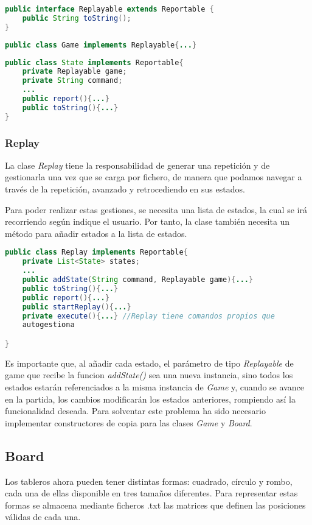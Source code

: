 \documentclass{article}
\begin{document}
\begin{lstlisting}[frame=single, language=Java]
public interface Replayable extends Reportable {
	public String toString();
}
\end{lstlisting}

\begin{lstlisting}[frame=single, language=Java]
public class Game implements Replayable{...}
\end{lstlisting}

\begin{lstlisting}[frame=single, language=Java]
public class State implements Reportable{
	private Replayable game;
	private String command;
	...
	public report(){...}
	public toString(){...}
}
\end{lstlisting}

\subsubsection*{Replay}
La clase \textit{Replay} tiene la responsabilidad de generar una repetición y de gestionarla una vez que se carga por fichero, de manera que podamos navegar a través de la repetición, avanzado y retrocediendo en sus estados.

Para poder realizar estas gestiones, se necesita una lista de estados, la cual se irá recorriendo según indique el usuario. Por tanto, la clase también necesita un método para añadir estados a la lista de estados.

\begin{lstlisting}[frame=single, language=Java]
public class Replay implements Reportable{
	private List<State> states;
	...
	public addState(String command, Replayable game){...}
	public toString(){...}
	public report(){...}
	public startReplay(){...}
	private execute(){...} //Replay tiene comandos propios que
	autogestiona

}
\end{lstlisting}

Es importante que, al añadir cada estado, el parámetro de tipo \textit{Replayable} de game que recibe la funcion \textit{addState()}  sea una nueva instancia, sino todos los estados estarán referenciados a la misma instancia de \textit{Game} y, cuando se avance en la partida, los cambios modificarán los estados anteriores, rompiendo así la funcionalidad deseada. Para solventar este problema ha sido necesario implementar constructores de copia para las clases \textit{Game} y \textit{Board}.

\subsection*{Board}
Los tableros ahora pueden tener distintas formas: cuadrado, círculo y rombo, cada una de ellas disponible en tres tamaños diferentes. Para representar estas formas se almacena mediante ficheros .txt las matrices que definen las posiciones válidas de cada una.
\end{document}
